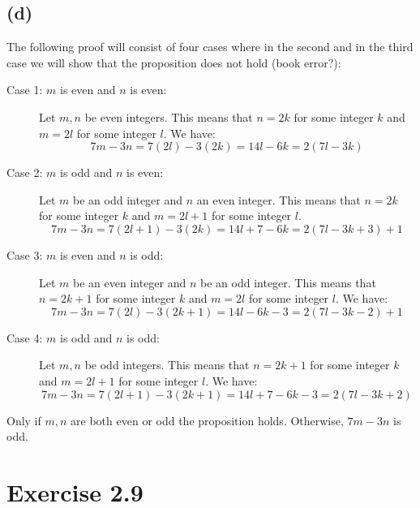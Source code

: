 \documentclass{article}
\begin{document}
\subsection*{(d)}

The following proof will consist of four cases where in the second and in the third
case we will show that the proposition does not hold (book error?):

\begin{description}
    \item[Case 1: $m$ is even and $n$ is even:]
	    Let $m, n$ be even integers. This means that $n = 2k$ for some
	    integer $k$ and $m = 2l$ for some integer $l$. We have:
	    \begin{equation*}
		7m -3n = 7(2l) - 3(2k) = 14l - 6k = 2(7l -3k)
	    \end{equation*}
    \item[Case 2: $m$ is odd and $n$ is even:]
	    Let $m$ be an odd integer and $n$ an even integer. This means that $n = 2k$ for some
	    integer $k$ and $m = 2l + 1$ for some integer $l$.
	    \begin{equation*}
		7m -3n = 7(2l + 1) - 3(2k) = 14l + 7 - 6k = 2(7l - 3k + 3) + 1
	    \end{equation*}
    \item[Case 3: $m$ is even and $n$ is odd:]	
	    Let $m$ be an even integer and $n$ be an odd integer. This means
	    that $n = 2k + 1$ for some
	    integer $k$ and $m = 2l$ for some integer $l$. We have:
	    \begin{equation*}
		7m -3n = 7(2l) - 3(2k+1) = 14l - 6k - 3 = 2(7l - 3k - 2) + 1
	    \end{equation*}
    \item[Case 4: $m$ is odd and $n$ is odd:]
	    Let $m, n$ be odd integers. This means that $n = 2k + 1$ for some
	    integer $k$ and $m = 2l + 1$ for some integer $l$. We have:
	    \begin{equation*}
		7m - 3n = 7(2l + 1) - 3(2k + 1) = 14l + 7 - 6k - 3 = 2(7l - 3k
		+ 2)
	    \end{equation*}
\end{description}

Only if $m,n$ are both even or odd the proposition holds. Otherwise, $7m - 3n$
is odd.



\section*{Exercise 2.9}
\end{document}
